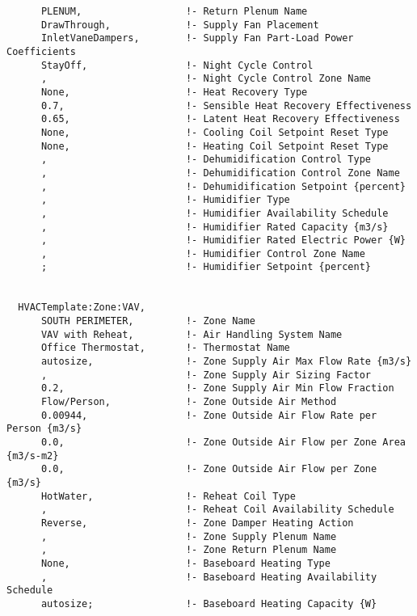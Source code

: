 \begin{lstlisting}
      PLENUM,                  !- Return Plenum Name
      DrawThrough,             !- Supply Fan Placement
      InletVaneDampers,        !- Supply Fan Part-Load Power Coefficients
      StayOff,                 !- Night Cycle Control
      ,                        !- Night Cycle Control Zone Name
      None,                    !- Heat Recovery Type
      0.7,                     !- Sensible Heat Recovery Effectiveness
      0.65,                    !- Latent Heat Recovery Effectiveness
      None,                    !- Cooling Coil Setpoint Reset Type
      None,                    !- Heating Coil Setpoint Reset Type
      ,                        !- Dehumidification Control Type
      ,                        !- Dehumidification Control Zone Name
      ,                        !- Dehumidification Setpoint {percent}
      ,                        !- Humidifier Type
      ,                        !- Humidifier Availability Schedule
      ,                        !- Humidifier Rated Capacity {m3/s}
      ,                        !- Humidifier Rated Electric Power {W}
      ,                        !- Humidifier Control Zone Name
      ;                        !- Humidifier Setpoint {percent}


  HVACTemplate:Zone:VAV,
      SOUTH PERIMETER,         !- Zone Name
      VAV with Reheat,         !- Air Handling System Name
      Office Thermostat,       !- Thermostat Name
      autosize,                !- Zone Supply Air Max Flow Rate {m3/s}
      ,                        !- Zone Supply Air Sizing Factor
      0.2,                     !- Zone Supply Air Min Flow Fraction
      Flow/Person,             !- Zone Outside Air Method
      0.00944,                 !- Zone Outside Air Flow Rate per Person {m3/s}
      0.0,                     !- Zone Outside Air Flow per Zone Area {m3/s-m2}
      0.0,                     !- Zone Outside Air Flow per Zone {m3/s}
      HotWater,                !- Reheat Coil Type
      ,                        !- Reheat Coil Availability Schedule
      Reverse,                 !- Zone Damper Heating Action
      ,                        !- Zone Supply Plenum Name
      ,                        !- Zone Return Plenum Name
      None,                    !- Baseboard Heating Type
      ,                        !- Baseboard Heating Availability Schedule
      autosize;                !- Baseboard Heating Capacity {W}



\end{lstlisting}
